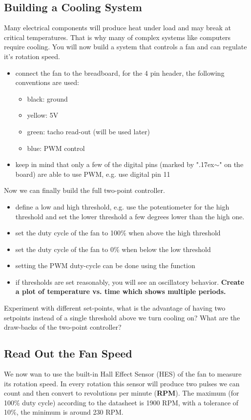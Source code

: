 \subsection{Building a Cooling System}\label{sec:cool}
Many electrical components will produce heat under load and may break at critical temperatures. That is why many of complex systems like computers require cooling. You will now build a system that controls a fan and can regulate it's rotation speed.
\begin{itemize}
	\item connect the fan to the breadboard, for the 4 pin header, the following conventions are used:
	\begin{itemize}
	    \item black: ground
	    \item yellow: 5V
	    \item green: tacho read-out (will be used later)
	    \item blue: PWM control
	\end{itemize}
	\item keep in mind that only a few of the digital pins (marked by "{\raise.17ex\hbox{$\scriptstyle\sim$}}" on the board) are able to use PWM, e.g. use digital pin 11
\end{itemize}
Now we can finally build the full two-point controller.
\begin{itemize}
    \item define a low and high threshold, e.g. use the potentiometer for the high threshold and set the lower threshold a few degrees lower than the high one.
	\item set the duty cycle of the fan to 100\% when above the high threshold
	\item set the duty cycle of the fan to 0\% when below the low threshold
	\item setting the PWM duty-cycle can be done using the  function
	\item if thresholds are set reasonably, you will see an oscillatory behavior. \textbf{Create a plot of temperature vs. time which shows multiple periods.}
\end{itemize}
Experiment with different set-points, what is the advantage of having two setpoints instead of a single threshold above we turn cooling on? What are the draw-backs of the two-point controller?

\subsection{Read Out the Fan Speed}
We now wan to use the built-in Hall Effect Sensor (HES) of the fan to measure its rotation speed. In every rotation this sensor will produce two pulses we can count and then convert to revolutions per minute (\textbf{RPM}). The maximum (for 100\% duty cycle) according to the datasheet is 1900 RPM, with a tolerance of 10\%, the minimum is around 230 RPM.

